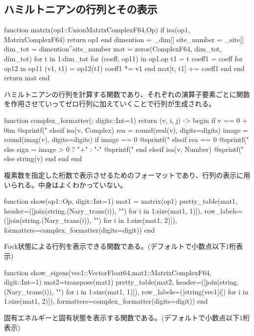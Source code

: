 \documentclass{ltjsarticle}
\begin{document}
\subsection*{ハミルトニアンの行列とその表示}
\begin{jllisting}
function matrix(op1::Union{Matrix{ComplexF64},Op})
  if isa(op1, Matrix{ComplexF64})
    return op1
  end
  dimention = _dim[]
  site_number = _site[]
  dim_tot = dimention^site_number
  mat = zeros(ComplexF64, dim_tot, dim_tot)
  for t in 1:dim_tot
    for (coeff, op11) in op1.op
      t1 = t
      coeff1 = coeff
      for op12 in op11
        (v1, t1) = op12(t1)
        coeff1 *= v1
      end
      mat[t, t1] += coeff1
    end
  end
  return mat
end
\end{jllisting}
ハミルトニアンの行列を計算する関数であり、それぞれの演算子要素ごとに関数を作用させていってゼロ行列に加えていくことで行列が生成される。\\
\begin{jllisting}
function complex_formatter(; digits::Int=1)
  return (v, i, j) -> begin
    if v == 0 + 0im
      @sprintf("%
    elseif isa(v, Complex)
      rea = round(real(v), digits=digits)
      image = round(imag(v), digits=digits)
      if image == 0
        @sprintf("%
      elseif rea == 0
        @sprintf("%
      else
        sign = image > 0 ? "+" : "-"
        @sprintf("%
      end
    elseif isa(v, Number)
      @sprintf("%
    else
      string(v)
    end
  end
end
\end{jllisting}
複素数を指定した桁数で表示させるためのフォーマットであり、行列の表示に用いられる。中身はよくわかっていない。\\
\begin{jllisting}
function show(op1::Op, digit::Int=1)
  mat1 = matrix(op1)
  pretty_table(mat1, header=([join(string.(Nary_trans(i)), "") for i in 1:size(mat1, 1)]), row_labels=([join(string.(Nary_trans(i)), "") for i in 1:size(mat1, 2)]), formatters=complex_formatter(digits=digit))
end
\end{jllisting}
Fock状態による行列を表示できる関数である。(デフォルトで小数点以下1桁表示)\\
\begin{jllisting}
function show_eigens(vec1::Vector{Float64},mat1::Matrix{ComplexF64}, digit::Int=1)
  mat2=transpose(mat1)
  pretty_table(mat2, header=([join(string.(Nary_trans(i)), "") for i in 1:size(mat1, 1)]), row_labels=([string(vec1[i]) for i in 1:size(mat1, 2)]), formatters=complex_formatter(digits=digit))
end
\end{jllisting}
固有エネルギーと固有状態を表示する関数である。(デフォルトで小数点以下1桁表示)\\
\end{document}
